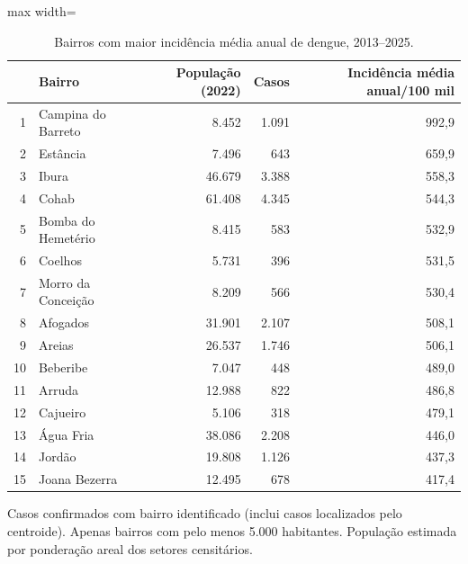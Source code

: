 \begin{table}[htbp]
\centering
\small
\caption{Bairros com maior incidência média anual de dengue, 2013--2025.}
\label{tab:incidencia}
\begin{adjustbox}{max width=\linewidth}
\begin{tabular}{rlrrr}
\toprule
& Bairro & População (2022) & Casos & Incidência média anual/100 mil \\
\midrule
1 & Campina do Barreto & 8.452 & 1.091 & 992,9 \\
2 & Estância & 7.496 & 643 & 659,9 \\
3 & Ibura & 46.679 & 3.388 & 558,3 \\
4 & Cohab & 61.408 & 4.345 & 544,3 \\
5 & Bomba do Hemetério & 8.415 & 583 & 532,9 \\
6 & Coelhos & 5.731 & 396 & 531,5 \\
7 & Morro da Conceição & 8.209 & 566 & 530,4 \\
8 & Afogados & 31.901 & 2.107 & 508,1 \\
9 & Areias & 26.537 & 1.746 & 506,1 \\
10 & Beberibe & 7.047 & 448 & 489,0 \\
11 & Arruda & 12.988 & 822 & 486,8 \\
12 & Cajueiro & 5.106 & 318 & 479,1 \\
13 & Água Fria & 38.086 & 2.208 & 446,0 \\
14 & Jordão & 19.808 & 1.126 & 437,3 \\
15 & Joana Bezerra & 12.495 & 678 & 417,4 \\
\bottomrule
\end{tabular}
\end{adjustbox}
\par\smallskip\begin{minipage}{0.95\linewidth}\footnotesize Casos confirmados com bairro identificado (inclui casos localizados pelo centroide). Apenas bairros com pelo menos 5.000 habitantes. População estimada por ponderação areal dos setores censitários.\end{minipage}
\end{table}
